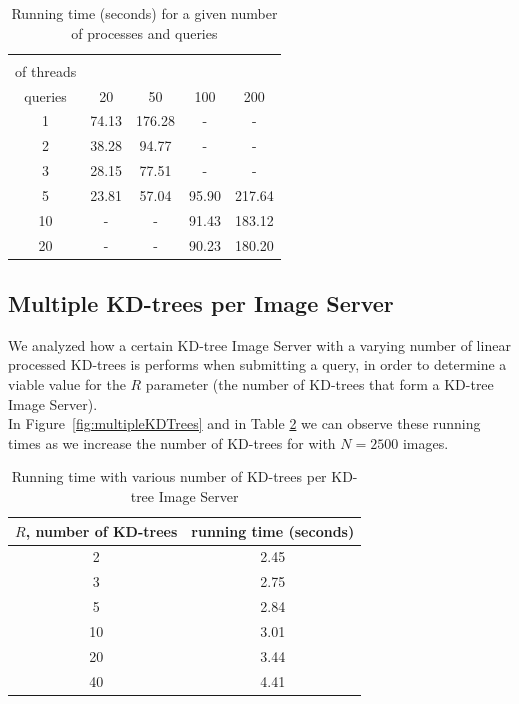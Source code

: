 \begin{table}[H]
\centering
\begin{tabular} {c | c | c | c | c}
	\backslashbox{number\\ of threads}{number of\\ queries} & 20 & 50 & 100 & 200 \\
	\hline
	1 & 74.13 & 176.28 & - & - \\
	2 & 38.28 & 94.77 & - & - \\
	3 & 28.15 & 77.51 & - & -\\
	5 & 23.81 & 57.04 & 95.90 & 217.64\\
	10 & - & - & 91.43 & 183.12 \\
	20 & - & - & 90.23 & 180.20 \\
\end{tabular}
\caption{Running time (seconds) for a given number of processes and queries}
\label{table:threadTime}
\end{table}

\subsection{Multiple KD-trees per Image Server}

We analyzed how a certain KD-tree Image Server with a varying number of linear processed KD-trees is performs when submitting a query, in order to determine a viable value for the $R$ parameter (the number of KD-trees that form a KD-tree Image Server).\\
In Figure~\ref{fig:multipleKDTrees} and in Table \ref{table:multipleKDTrees} we can observe these running times as we increase the number of KD-trees for with $N=2500$ images.\\

\begin{table}[H]
\centering
\begin{tabular}{c | c}
	$R$, number of KD-trees & running time (seconds) \\
	\hline
	2 & 2.45 \\
	3 & 2.75 \\
	5 & 2.84 \\
	10 & 3.01 \\
	20 & 3.44 \\
	40 & 4.41 \\
\end{tabular}
\caption{Running time with various number of KD-trees per KD-tree Image Server}
\label{table:multipleKDTrees}
\end{table}

